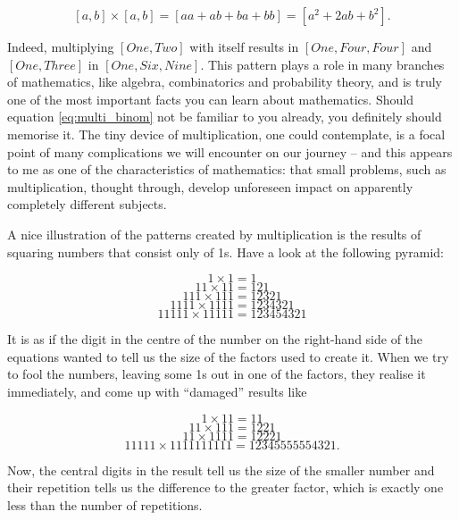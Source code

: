 \documentclass{scrreprt}
\begin{document}
\begin{equation}\label{eq:multi_binom}
[a,b] \times [a,b] = [aa + ab + ba + bb] =
[a^2 + 2ab + b^2].
\end{equation} 

Indeed, multiplying $[One,Two]$ with itself
results in 
$[One,Four,Four]$
and $[One,Three]$ in
$[One,Six,Nine]$.
This pattern plays a role
in many branches of mathematics,
like algebra, combinatorics and probability theory,
and is truly one of the most important facts
you can learn about mathematics.
Should equation \ref{eq:multi_binom} 
not be familiar to you already,
you definitely should memorise it.
The tiny device of multiplication,
one could contemplate, is a focal point
of many complications we will encounter
on our journey -- and this appears to me
as one of the characteristics of mathematics:
that small problems, such as multiplication,
thought through, develop unforeseen 
impact on apparently completely different subjects.

A nice illustration of the patterns
created by multiplication is the results
of squaring numbers that consist only of 1s.
Have a look at the following pyramid:

\begin{minipage}{\textwidth}
\[
1 \times 1 = 1
\]
\[
11 \times 11 = 121
\]
\[
111 \times 111 = 12321
\]
\[
1111 \times 1111 = 1234321
\]
\[
11111 \times 11111 = 123454321
\]
\end{minipage}

It is as if the digit in the centre of the number
on the right-hand side of the equations
wanted to tell us the size of the factors
used to create it. 
When we try to fool the numbers,
leaving some 1s out in one of the factors,
they realise it immediately,
and come up with ``damaged'' results like 

\begin{minipage}{\textwidth}
\[
1 \times 11 = 11
\]
\[
11 \times 111 = 1221
\]
\[
11 \times 1111 = 12221
\]
\[
11111 \times 1111111111 = 12345555554321.
\]
\end{minipage}

Now, the central digits in the result tell us
the size of the smaller number and their repetition
tells us the difference to the greater factor,
which is exactly one less than the number
of repetitions.
\end{document}
